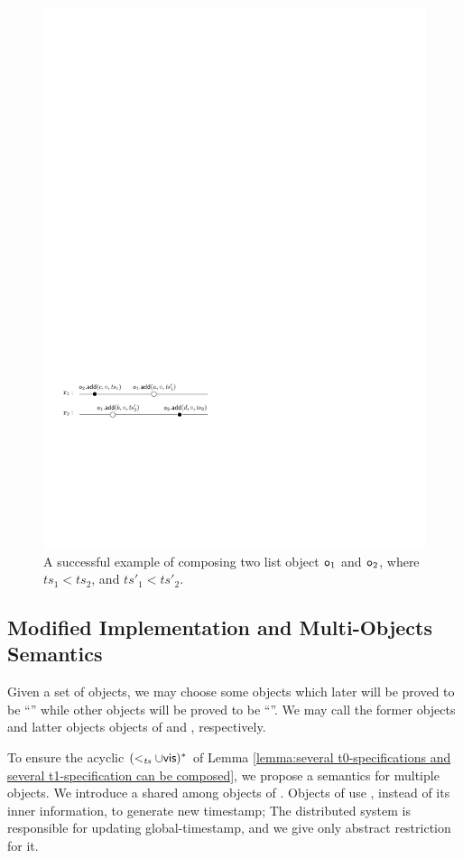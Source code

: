 \begin{figure}[t]
  \centering
  \includegraphics[width=0.45 \textwidth]{figures/Compose-TwoList.pdf}
\vspace{-10pt}
  \caption{A successful example of composing two \tonelinearizable list object $\mathtt{o}_1$ and $\mathtt{o}_2$, where $\mathit{ts}_1 < \mathit{ts}_2$, and $\mathit{ts}'_1 < \mathit{ts}'_2$.}
  \label{fig:compose two list}
\end{figure}






\subsection{Modified Implementation and Multi-Objects Semantics}
\label{subsec:smodified implementation and multi-objects semantics}

Given a set of objects, we may choose some objects which later will be proved to be ``\tzerolinearizable{}'' while other objects will be proved to be ``\tonelinearizable{}''. We may call the former objects and latter objects objects of \tzerolin{} and \tonelin{}, respectively.

To ensure the acyclic $(<_{\mathit{ts}} \cup \mathsf{vis})^*$ of Lemma \ref{lemma:several t0-specifications and several t1-specification can be composed}, we propose a semantics for multiple objects. %
We introduce a \gts{} shared among objects of \tonelin{}. Objects of \tonelin{} use \gts{}, instead of its inner information, to generate new timestamp; The distributed system is responsible for updating global-timestamp, and we give only abstract restriction for it.

